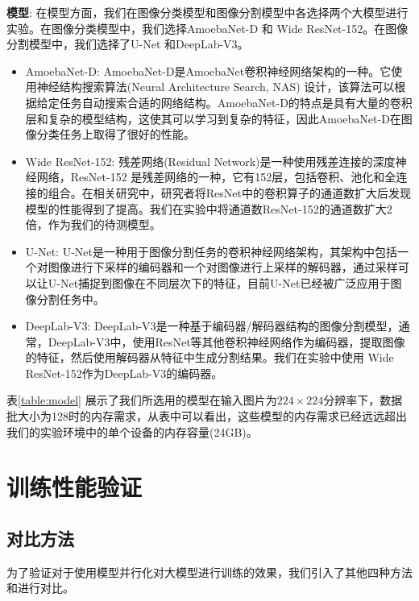 \noindent\textbf{模型}: 在模型方面，我们在图像分类模型和图像分割模型中各选择两个大模型进行实验。在图像分类模型中，我们选择AmoebaNet-D 和 Wide ResNet-152。在图像分割模型中，我们选择了U-Net 和DeepLab-V3。
\begin{itemize}
	\item AmoebaNet-D: AmoebaNet-D是AmoebaNet卷积神经网络架构的一种。它使用神经结构搜索算法(Neural Architecture Search, NAS) 设计，该算法可以根据给定任务自动搜索合适的网络结构。AmoebaNet-D的特点是具有大量的卷积层和复杂的模型结构，这使其可以学习到复杂的特征，因此AmoebaNet-D在图像分类任务上取得了很好的性能。
	\item Wide ResNet-152: 残差网络(Residual Network)是一种使用残差连接的深度神经网络，ResNet-152 是残差网络的一种，它有152层，包括卷积、池化和全连接的组合。在相关研究中，研究者将ResNet中的卷积算子的通道数扩大后发现模型的性能得到了提高。我们在实验中将通道数ResNet-152的通道数扩大2倍，作为我们的待测模型。
	\item U-Net: U-Net是一种用于图像分割任务的卷积神经网络架构，其架构中包括一个对图像进行下采样的编码器和一个对图像进行上采样的解码器，通过采样可以让U-Net捕捉到图像在不同层次下的特征，目前U-Net已经被广泛应用于图像分割任务中。
	\item DeepLab-V3: DeepLab-V3是一种基于编码器/解码器结构的图像分割模型，通常，DeepLab-V3中，使用ResNet等其他卷积神经网络作为编码器，提取图像的特征，然后使用解码器从特征中生成分割结果。我们在实验中使用 Wide ResNet-152作为DeepLab-V3的编码器。
\end{itemize}
表\ref{table:model} 展示了我们所选用的模型在输入图片为$224\times 224$分辨率下，数据批大小为128时的内存需求，从表中可以看出，这些模型的内存需求已经远远超出我们的实验环境中的单个设备的内存容量(24GB)。




\section{训练性能验证}
\label{sec:performace}
\subsection{对比方法}
为了验证\sys{}对于使用模型并行化对大模型进行训练的效果，我们引入了其他四种方法和\sys{}进行对比。

